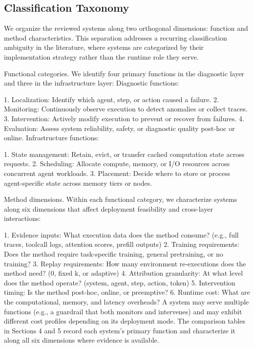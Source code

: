 \documentclass[preprint,12pt]{elsarticle}
\begin{document}
\subsection{Classification Taxonomy}
We organize the reviewed systems along two orthogonal dimensions: function and method characteristics. This separation addresses a recurring classification ambiguity in the literature, where systems are categorized by their implementation strategy rather than the runtime role they serve.


Functional categories. We identify four primary functions in the diagnostic layer and three in the infrastructure layer: Diagnostic functions:


1. Localization: Identify which agent, step, or action caused a failure. 2. Monitoring: Continuously observe execution to detect anomalies or collect traces. 3. Intervention: Actively modify execution to prevent or recover from failures. 4. Evaluation: Assess system reliability, safety, or diagnostic quality post-hoc or online. Infrastructure functions:


1. State management: Retain, evict, or transfer cached computation state across requests. 2. Scheduling: Allocate compute, memory, or I/O resources across concurrent agent workloads. 3. Placement: Decide where to store or process agent-specific state across memory tiers or nodes.


Method dimensions. Within each functional category, we characterize systems along six dimensions that affect deployment feasibility and cross-layer interactions:


1. Evidence inputs: What execution data does the method consume? (e.g., full traces, toolcall logs, attention scores, prefill outputs) 2. Training requirements: Does the method require task-specific training, general pretraining, or no training? 3. Replay requirements: How many environment re-executions does the method need? (0, fixed k, or adaptive) 4. Attribution granularity: At what level does the method operate? (system, agent, step, action, token) 5. Intervention timing: Is the method post-hoc, online, or preemptive? 6. Runtime cost: What are the computational, memory, and latency overheads? A system may serve multiple functions (e.g., a guardrail that both monitors and intervenes) and may exhibit different cost profiles depending on its deployment mode. The comparison tables in Sections 4 and 5 record each system's primary function and characterize it along all six dimensions where evidence is available.
\end{document}
